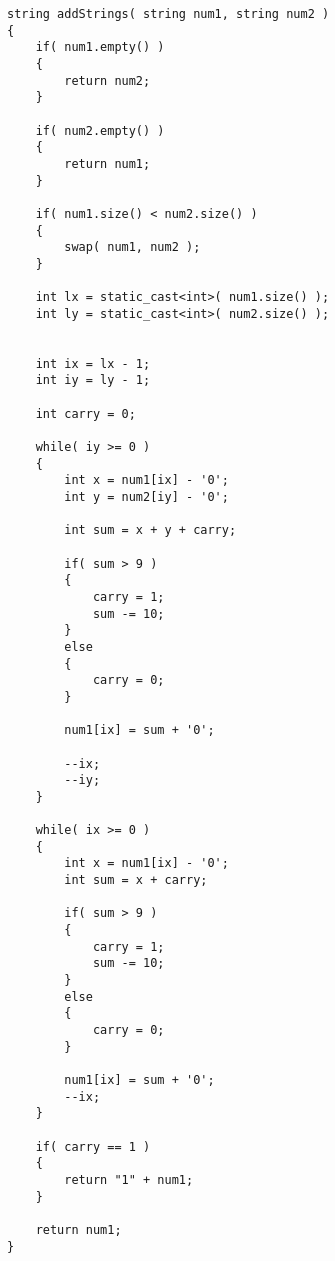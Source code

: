 \setcounter{lstlisting}{0}
\begin{lstlisting}[style=customc, caption={Just Add}]
string addStrings( string num1, string num2 )
{
    if( num1.empty() )
    {
        return num2;
    }

    if( num2.empty() )
    {
        return num1;
    }

    if( num1.size() < num2.size() )
    {
        swap( num1, num2 );
    }

    int lx = static_cast<int>( num1.size() );
    int ly = static_cast<int>( num2.size() );


    int ix = lx - 1;
    int iy = ly - 1;

    int carry = 0;

    while( iy >= 0 )
    {
        int x = num1[ix] - '0';
        int y = num2[iy] - '0';

        int sum = x + y + carry;

        if( sum > 9 )
        {
            carry = 1;
            sum -= 10;
        }
        else
        {
            carry = 0;
        }

        num1[ix] = sum + '0';

        --ix;
        --iy;
    }

    while( ix >= 0 )
    {
        int x = num1[ix] - '0';
        int sum = x + carry;

        if( sum > 9 )
        {
            carry = 1;
            sum -= 10;
        }
        else
        {
            carry = 0;
        }

        num1[ix] = sum + '0';
        --ix;
    }

    if( carry == 1 )
    {
        return "1" + num1;
    }

    return num1;
}
\end{lstlisting}
